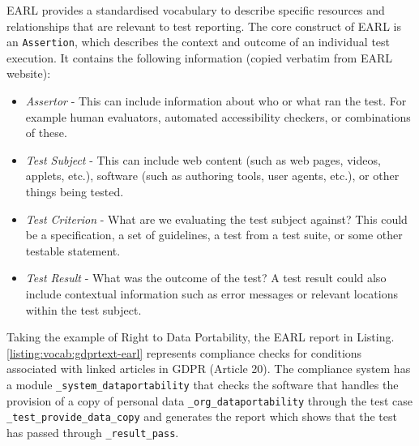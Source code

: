EARL provides a standardised vocabulary to describe specific resources and relationships that are relevant to test reporting. The core construct of EARL is an \texttt{Assertion}, which describes the context and outcome of an individual test execution. It contains the following information (copied verbatim from EARL website):

\begin{itemize}
    \item \textit{Assertor} - This can include information about who or what ran the test. For example human evaluators, automated accessibility checkers, or combinations of these.
    \item \textit{Test Subject} - This can include web content (such as web pages, videos, applets, etc.), software (such as authoring tools, user agents, etc.), or other things being tested.
    \item \textit{Test Criterion} - What are we evaluating the test subject against? This could be a specification, a set of guidelines, a test from a test suite, or some other testable statement.
    \item \textit{Test Result} - What was the outcome of the test? A test result could also include contextual information such as error messages or relevant locations within the test subject.
\end{itemize}

Taking the example of Right to Data Portability, the EARL report in Listing.\ref{listing:vocab:gdprtext-earl} represents compliance checks for conditions associated with linked articles in GDPR (Article 20). The compliance system has a module \texttt{\_system\_dataportability} that checks the software that handles the provision of a copy of personal data \texttt{\_org\_dataportability} through the test case \texttt{\_test\_provide\_data\_copy} and generates the report which shows that the test has passed through \texttt{\_result\_pass}.

